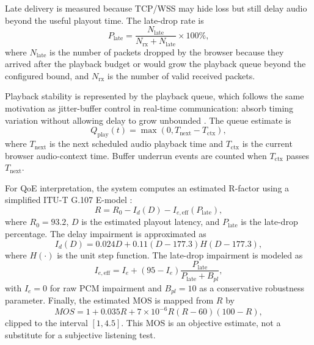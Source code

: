 \documentclass[conference]{IEEEtran}
\begin{document}
Late delivery is measured because TCP/WSS may hide loss but still delay audio beyond the useful playout time. The late-drop rate is
\begin{equation}
    P_{\mathrm{late}} =
    \frac{N_{\mathrm{late}}}{N_{\mathrm{rx}}+N_{\mathrm{late}}}\times100\%,
    \label{eq:late}
\end{equation}
where $N_{\mathrm{late}}$ is the number of packets dropped by the browser because they arrived after the playback budget or would grow the playback queue beyond the configured bound, and $N_{\mathrm{rx}}$ is the number of valid received packets.

Playback stability is represented by the playback queue, which follows the same motivation as jitter-buffer control in real-time communication: absorb timing variation without allowing delay to grow unbounded \cite{ieee_jitter_buffer_pd}. The queue estimate is
\begin{equation}
    Q_{\mathrm{play}}(t)=\max(0,T_{\mathrm{next}}-T_{\mathrm{ctx}}),
    \label{eq:qplay}
\end{equation}
where $T_{\mathrm{next}}$ is the next scheduled audio playback time and $T_{\mathrm{ctx}}$ is the current browser audio-context time. Buffer underrun events are counted when $T_{\mathrm{ctx}}$ passes $T_{\mathrm{next}}$.

For QoE interpretation, the system computes an estimated R-factor using a simplified ITU-T G.107 E-model \cite{itut_g107}:
\begin{equation}
    R = R_0 - I_d(D) - I_{e,\mathrm{eff}}(P_{\mathrm{late}}),
    \label{eq:rfactor}
\end{equation}
where $R_0=93.2$, $D$ is the estimated playout latency, and $P_{\mathrm{late}}$ is the late-drop percentage. The delay impairment is approximated as
\begin{equation}
    I_d(D)=0.024D + 0.11(D-177.3)H(D-177.3),
    \label{eq:id}
\end{equation}
where $H(\cdot)$ is the unit step function. The late-drop impairment is modeled as
\begin{equation}
    I_{e,\mathrm{eff}}=I_e+(95-I_e)\frac{P_{\mathrm{late}}}{P_{\mathrm{late}}+B_{pl}},
    \label{eq:ieeff}
\end{equation}
with $I_e=0$ for raw PCM impairment and $B_{pl}=10$ as a conservative robustness parameter. Finally, the estimated MOS is mapped from $R$ by
\begin{equation}
    MOS = 1 + 0.035R + 7\times10^{-6}R(R-60)(100-R),
    \label{eq:mos}
\end{equation}
clipped to the interval $[1,4.5]$. This MOS is an objective estimate, not a substitute for a subjective listening test.
\end{document}

